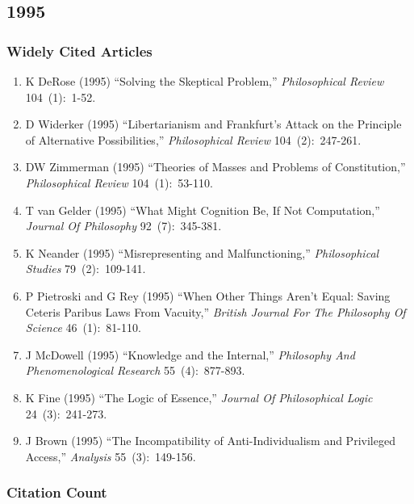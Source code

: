 \documentclass[
  10pt,
  letterpaper,
  DIV=11,
  numbers=noendperiod,
  twoside]{scrartcl}
\providecommand{\tightlist}{%
  \setlength{\itemsep}{0pt}\setlength{\parskip}{0pt}}\usepackage{longtable,booktabs,array}
\begin{document}
\newpage

\subsection{1995}\label{sec-s1995}

\subsubsection*{Widely Cited Articles}\label{widely-cited-articles-39}

\begin{enumerate}
\def\labelenumi{\arabic{enumi}.}
\tightlist
\item
  K DeRose (1995) ``Solving the Skeptical Problem,'' \emph{Philosophical
  Review} 104~(1):~1-52.
\item
  D Widerker (1995) ``Libertarianism and Frankfurt's Attack on the
  Principle of Alternative Possibilities,'' \emph{Philosophical Review}
  104~(2):~247-261.
\item
  DW Zimmerman (1995) ``Theories of Masses and Problems of
  Constitution,'' \emph{Philosophical Review} 104~(1):~53-110.
\item
  T van Gelder (1995) ``What Might Cognition Be, If Not Computation,''
  \emph{Journal Of Philosophy} 92~(7):~345-381.
\item
  K Neander (1995) ``Misrepresenting and Malfunctioning,''
  \emph{Philosophical Studies} 79~(2):~109-141.
\item
  P Pietroski and G Rey (1995) ``When Other Things Aren't Equal: Saving
  Ceteris Paribus Laws From Vacuity,'' \emph{British Journal For The
  Philosophy Of Science} 46~(1):~81-110.
\item
  J McDowell (1995) ``Knowledge and the Internal,'' \emph{Philosophy And
  Phenomenological Research} 55~(4):~877-893.
\item
  K Fine (1995) ``The Logic of Essence,'' \emph{Journal Of Philosophical
  Logic} 24~(3):~241-273.
\item
  J Brown (1995) ``The Incompatibility of Anti-Individualism and
  Privileged Access,'' \emph{Analysis} 55~(3):~149-156.
\end{enumerate}

\subsubsection*{Citation Count}\label{sec-count-1995}
\end{document}
